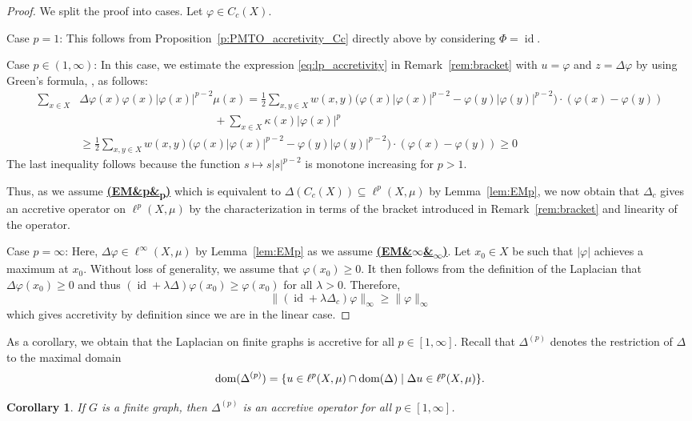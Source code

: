 \documentclass[letterpaper]{article}
\newtheorem{corollary}[lemma]{Corollary}
\theoremstyle{definition}
\theoremstyle{named}
\numberwithin{equation}{section}
\newcommand{\EM}[1][]{\hyperlink{ass:EM}{\textup{\textbf{(EM\ifx&#1&\else\textsubscript{#1}\fi)}}}}
\newcommand{\lm}{\lambda}
\newcommand{\dom}{\textnormal{dom}} %
\newcommand{\id}{\operatorname{id}}
\newcommand{\Dep}{\Delta^{(p)}}
\begin{document}
\begin{proof}
    We split the proof into cases. Let $\varphi \in C_c(X)$.

    Case $p=1$: This follows from Proposition~\ref{p:PMTO_accretivity_Cc}
    directly above by considering $\Phi=\id$.

    Case $p\in(1,\infty)$:
    In this case, we estimate the expression \eqref{eq:lp_accretivity} in Remark~\ref{rem:bracket} 
    with $u=\varphi$ and $z = \Delta \varphi$ by using Green's formula, \cite[Proposition~1.5]{keller2021graphs}, as follows:  
    \begin{align*}
        \sum_{x \in X} & \Delta\varphi(x)  \varphi(x) |\varphi(x)|^{p-2} \mu(x) =
        \frac{1}{2}
        \sum_{x,y \in X} w(x,y)
        \bigl(\varphi(x) |\varphi(x)|^{p-2} - \varphi(y) |\varphi(y)|^{p-2}\bigr) \cdot(\varphi(x)-\varphi(y)) \\
        & \hspace{2in} + \sum_{x \in X}\kappa(x)|\varphi(x)|^p  \\
        &\geq  \frac{1}{2}\sum_{x,y \in X} w(x,y)
        \bigl(\varphi(x) |\varphi(x)|^{p-2} - \varphi(y) |\varphi(y)|^{p-2}\bigr) \cdot(\varphi(x)-\varphi(y)) \geq 0
    \end{align*}
    { The last inequality follows because the function
    $s\mapsto s|s|^{p-2}$ is monotone increasing for $p>1$.}

    Thus, as we assume \EM[p] which is equivalent to $\Delta(C_c(X)) \subseteq \ell^p(X,\mu)$
    by Lemma~\ref{lem:EMp}, we now obtain that $\Delta_c$ gives an accretive operator
    on $\ell^p(X,\mu)$ by the characterization in terms of the bracket 
    introduced in Remark~\ref{rem:bracket} and
    linearity of the operator.

    Case $p=\infty$:
    Here, $\Delta \varphi \in \ell^\infty(X,\mu)$ by Lemma~\ref{lem:EMp} as we assume \EM[$\infty$].
    Let $x_0 \in X$ be such that $|\varphi|$ achieves a maximum
    at $x_0$.
    Without loss of generality, we assume that $\varphi(x_0) \geq 0$. It then follows
    from the definition of the Laplacian that $\Delta \varphi(x_0)\geq0$ and thus
    $(\id + \lm \Delta)\varphi(x_0) \geq \varphi(x_0)$ for all $\lm>0$. Therefore,
    $$\| (\id + \lm \Delta_c)\varphi \|_\infty \geq \|\varphi\|_\infty $$
    which gives accretivity by definition since we are in the linear case.
\end{proof}

As a corollary, we obtain that the Laplacian on finite graphs is
accretive for all $p \in [1,\infty]$.  Recall that $\Dep$ denotes the restriction
of $\Delta$ to the maximal domain
$$\dom(\Dep)= \{ u \in \ell^p(X,\mu) \cap \dom(\Delta) \mid \Delta u \in \ell^p(X,\mu)\}.$$
\begin{corollary}\label{c:accretive_finite_Lap}
    If $G$ is a finite graph, then $\Dep$ is an accretive
    operator for all $p \in [1,\infty]$.
\end{corollary}
\end{document}
